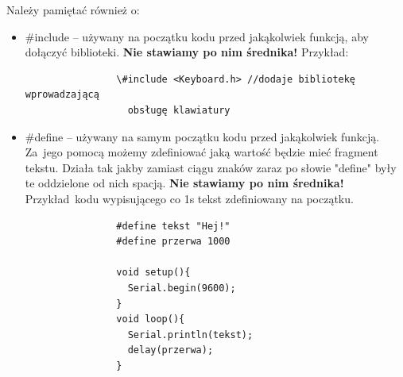 \documentclass[a4paper,12pt, twoside]{article}
\begin{document}
	Należy pamiętać również o:
	\begin{itemize}
		\item \#include -- używany na początku kodu przed jakąkolwiek funkcją, aby dołączyć biblioteki. \textbf{Nie stawiamy po nim średnika!} Przykład:
			\begin{verbatim}
				\#include <Keyboard.h> //dodaje bibliotekę wprowadzającą
				  obsługę klawiatury
			\end{verbatim}
		\item \#define -- używany na samym początku kodu przed jakąkolwiek funkcją. Za~jego pomocą możemy zdefiniować jaką wartość będzie mieć fragment tekstu.
		Działa tak jakby zamiast ciągu znaków zaraz po słowie "define" były te oddzielone od nich spacją. \textbf{Nie stawiamy po nim średnika!} Przykład~kodu wypisującego co 1s tekst zdefiniowany na początku.
			\begin{verbatim}
				#define tekst "Hej!"
				#define przerwa 1000
				
				void setup(){
				  Serial.begin(9600);
				}
				void loop(){
				  Serial.println(tekst);
				  delay(przerwa);
				}
			\end{verbatim}
	\end{itemize}
\end{document}
